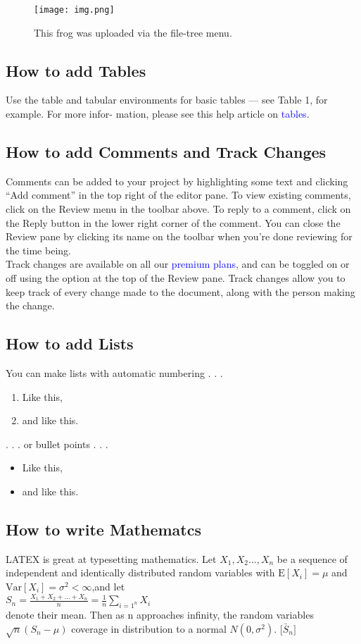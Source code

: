 \documentclass{article}
\begin{document}
	\begin{figure}
		    \centering
		    \texttt{[image: img.png]}
		    \label{fig:enter-label}
				\caption{This frog was uploaded via the file-tree menu.}
	\end{figure}
\vspace{5cm}

\subsection{ How to add Tables}
Use the table and tabular environments for basic tables — see Table 1, for example. For more infor-
mation, please see this help article on {\textcolor{blue}{tables}}.

\subsection{How to add Comments and Track Changes}
Comments can be added to your project by highlighting some text and clicking “Add comment” in
the top right of the editor pane. To view existing comments, click on the Review menu in the toolbar
above. To reply to a comment, click on the Reply button in the lower right corner of the comment.
You can close the Review pane by clicking its name on the toolbar when you’re done reviewing for the
time being.\\
Track changes are available on all our {\textcolor{blue}{premium plans}}, and can be toggled on or off using the option
at the top of the Review pane. Track changes allow you to keep track of every change made to the
document, along with the person making the change.

\subsection{How to add Lists}
You can make lists with automatic numbering . . .

\begin{enumerate}
		\item Like this,
		\item and like this.
\end{enumerate}
	. . . or bullet points . . .
\begin{itemize}
	\item Like this,
	\item and like this.	
\end{itemize}

\subsection{How to write Mathematcs}
LATEX is great at typesetting mathematics. Let $X_1,X_2\ldots,X_n$ be a sequence of independent and
identically distributed random variables with $\mathrm{E}[X_i]=\mu$ and $\mathrm{Var}[X_i]=\sigma^2 < \infty$,and let \\
$S_n=\frac{X_1+X_2+\ldots+X_n}{n}=\frac{1}{n}\sum_{i=1^n}X_i$
\\
denote their mean. Then as n approaches infinity, the random variables $\sqrt{n}(S_n - \mu)$ coverage in distribution to a normal $N(0,\sigma^2)$. $\mathrm[\bar S_n]$
\end{document}
